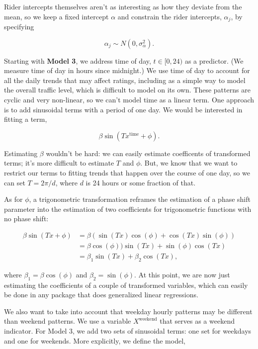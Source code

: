 \documentclass[]{article}
\begin{document}
Rider intercepts themselves aren't as interesting as how they deviate
from the mean, so we keep a fixed intercept \(\alpha\) and constrain the
rider intercepts, \(\alpha_j\), by specifying

\[\alpha_j \sim N(0, \sigma^2_\alpha).\]

Starting with \textbf{Model 3}, we address time of day,
\(t \in [0, 24)\) as a predictor. (We measure time of day in hours since
midnight.) We use time of day to account for all the daily trends that
may affect ratings, including as a simple way to model the overall
traffic level, which is difficult to model on its own. These patterns
are cyclic and very non-linear, so we can't model time as a linear term.
One approach is to add sinusoidal terms with a period of one day. We
would be interested in fitting a term,

\[\beta \sin (T x^{\text{time}} + \phi).\]

Estimating \(\beta\) wouldn't be hard: we can easily estimate
coefficents of transformed terms; it's more difficult to estimate \(T\)
and \(\phi\). But, we know that we want to restrict our terms to fitting
trends that happen over the course of one day, so we can set
\(T = 2 \pi / d\), where \(d\) is 24 hours or some fraction of that.

As for \(\phi\), a trigonometric transformation reframes the estimation
of a phase shift parameter into the estimation of two coefficients for
trigonometric functions with no phase shift:

\begin{align*}
\beta \sin (T x + \phi) &= 
\beta \left( \sin (T x) \cos (\phi) + \cos (T x) \sin (\phi) \right)\\
&= \beta \cos (\phi)) \sin (T x) + \sin (\phi) \cos (T x)\\
&= \beta_1 \sin (T x) + \beta_2 \cos (T x),
\end{align*}

where \(\beta_1 = \beta \cos (\phi)\) and \(\beta_2 = \sin (\phi).\) At
this point, we are now just estimating the coefficients of a couple of
transformed variables, which can easily be done in any package that does
generalized linear regressions.

We also want to take into account that weekday hourly patterns may be
different than weekend patterns. We use a variable \(X^\text{weekend}\)
that serves as a weekend indicator. For Model 3, we add two sets of
sinusoidal terms: one set for weekdays and one for weekends. More
explicitly, we define the model,
\end{document}
